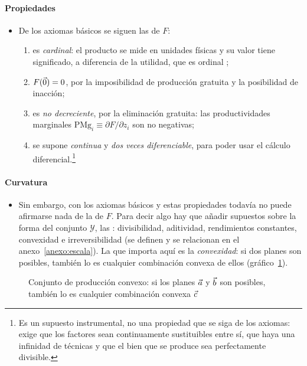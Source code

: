 \documentclass[11pt]{article}
\begin{document}
\paragraph{Propiedades}

\begin{itemize}
\item De los axiomas básicos se siguen las  de $F$:
  \begin{enumerate}
  \item es \emph{cardinal}: el producto se mide en unidades físicas y su valor tiene significado, a diferencia de la utilidad, que es ordinal ;
  \item $F(\vec{0})=0$, por la imposibilidad de producción gratuita y la posibilidad de inacción;
  \item es \emph{no decreciente}, por la eliminación gratuita: las productividades marginales $\mathrm{PMg}_i\equiv\partial F/\partial z_i$ son no negativas;
  \item se supone \emph{continua} y \emph{dos veces diferenciable}, para poder usar el cálculo diferencial.\footnote{Es un supuesto instrumental, no una propiedad que se siga de los axiomas: exige que los factores sean continuamente sustituibles entre sí, que haya una infinidad de técnicas y que el bien que se produce sea perfectamente divisible.}
  \end{enumerate}
\end{itemize}

\paragraph{Curvatura}

\begin{itemize}
\item Sin embargo, con los axiomas básicos y estas propiedades todavía no puede afirmarse nada de la  de $F$. Para decir algo hay que añadir supuestos sobre la forma del conjunto $\mathcal{Y}$, las : divisibilidad, aditividad, rendimientos constantes, convexidad e irreversibilidad (se definen y se relacionan en el anexo~\ref{anexo:escala})\nocite{MasColellWhinstonGreen1995}. La que importa aquí es la \emph{convexidad}: si dos planes son posibles, también lo es cualquier combinación convexa de ellos (gráfico~\ref{fig:convexidad-conjunto}).
\end{itemize}

\begin{figure}[H]
\centering
\caption{Conjunto de producción convexo: si los planes $\vec{a}$ y $\vec{b}$ son posibles, también lo es cualquier combinación convexa $\vec{c}$}\label{fig:convexidad-conjunto}
\end{figure}
\end{document}

